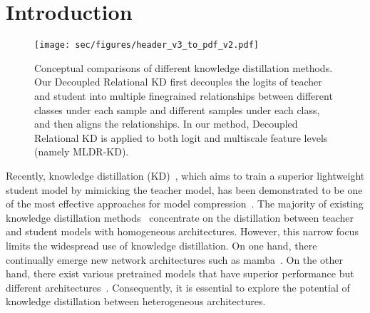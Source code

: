 \section{Introduction}
\label{sec:intro}

\begin{figure}[t]
  \centering
  \texttt{[image: sec/figures/header\_v3\_to\_pdf\_v2.pdf]}
  \vspace{-2mm}
  \caption{Conceptual comparisons of different knowledge distillation methods.
  Our Decoupled Relational KD first decouples the logits of teacher and student into multiple finegrained relationships between different classes under each sample and different samples under each class, and then aligns the relationships. In our method, Decoupled Relational KD is applied to both logit and multiscale feature levels (namely MLDR-KD).
  }
  \label{fig:header}
  \vspace{-4mm}
\end{figure}

Recently, knowledge distillation (KD)~\cite{hinton2015distilling}, which aims to train a superior lightweight student model by mimicking the teacher model, has been demonstrated to be one of the most effective approaches for model compression~\cite{tang2022patchslimmingefficientvision,zhang2019your}. 
The majority of existing knowledge distillation methods~\cite{tang2022patchslimmingefficientvision,zhang2019your,phuong2019distillation,luan2019msd,zhu2018knowledge} concentrate on the 
distillation between teacher and student models with homogeneous architectures. 
However, this narrow focus limits the widespread use of knowledge distillation. On one hand, there continually emerge new network architectures such as mamba~\cite{gu2023mamba}. On the other hand, there exist various pretrained models that have superior performance but different architectures~\cite{he2022masked,xie2022simmim,beit}.
Consequently, it is essential to explore the potential of knowledge distillation between heterogeneous architectures.

